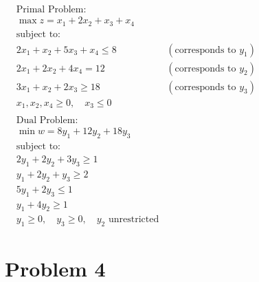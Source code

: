 \documentclass{article}
\begin{document}
$\begin{aligned}
& \text{Primal Problem:} \\
& \max z = x_1 + 2x_2 + x_3 + x_4 \\
& \text{subject to:} \\
& 2x_1 + x_2 + 5x_3 + x_4 \leq 8 & (\text{corresponds to } y_1) \\
& 2x_1 + 2x_2 + 4x_4 = 12 & (\text{corresponds to } y_2) \\
& 3x_1 + x_2 + 2x_3 \geq 18 & (\text{corresponds to } y_3) \\
& x_1, x_2, x_4 \geq 0, \quad x_3 \leq 0 \\
& \\
& \text{Dual Problem:} \\
& \min w = 8y_1 + 12y_2 + 18y_3 \\
& \text{subject to:} \\
& 2y_1 + 2y_2 + 3y_3 \geq 1 \\
& y_1 + 2y_2 + y_3 \geq 2 \\
& 5y_1 + 2y_3 \leq 1 \\
& y_1 + 4y_2 \geq 1 \\
& y_1 \geq 0, \quad y_3 \geq 0, \quad y_2 \text{ unrestricted}
\end{aligned}$

\section*{\textbf{Problem 4}}
\end{document}
